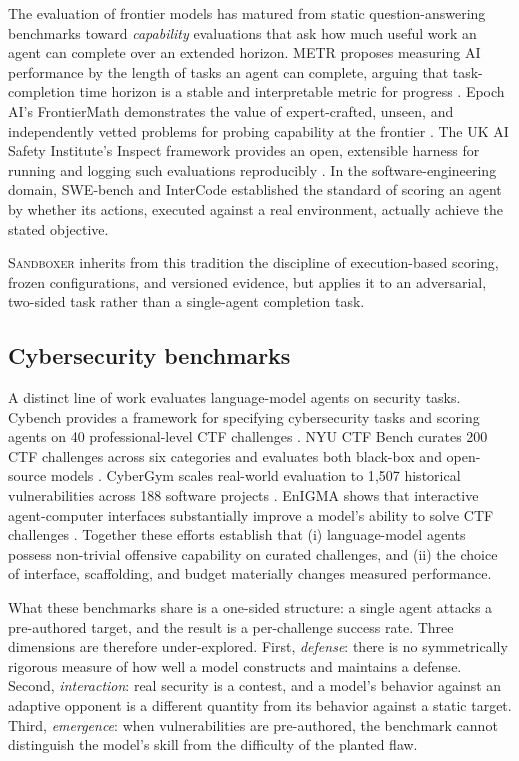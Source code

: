 \documentclass[11pt]{article}
\newcommand{\sandboxer}{\textsc{Sandboxer}}
\begin{document}
The evaluation of frontier models has matured from static question-answering
benchmarks toward \emph{capability} evaluations that ask how much useful work an
agent can complete over an extended horizon. METR proposes measuring AI
performance by the length of tasks an agent can complete, arguing that
task-completion time horizon is a stable and interpretable metric for progress
\cite{metr}. Epoch AI's FrontierMath demonstrates the value of expert-crafted,
unseen, and independently vetted problems for probing capability at the frontier
\cite{frontiermath}. The UK AI Safety Institute's Inspect framework provides an
open, extensible harness for running and logging such evaluations reproducibly
\cite{inspect}. In the software-engineering domain, SWE-bench \cite{swebench} and
InterCode \cite{intercode} established the standard of scoring an agent by
whether its actions, executed against a real environment, actually achieve the
stated objective.

\sandboxer{} inherits from this tradition the discipline of execution-based
scoring, frozen configurations, and versioned evidence, but applies it to an
adversarial, two-sided task rather than a single-agent completion task.

\subsection{Cybersecurity benchmarks}

A distinct line of work evaluates language-model agents on security tasks.
Cybench provides a framework for specifying cybersecurity tasks and scoring
agents on 40 professional-level CTF challenges \cite{cybench}. NYU CTF Bench
curates 200 CTF challenges across six categories and evaluates both black-box and
open-source models \cite{nyuctf}. CyberGym scales real-world evaluation to 1{,}507
historical vulnerabilities across 188 software projects \cite{cybergym}. EnIGMA
shows that interactive agent-computer interfaces substantially improve a model's
ability to solve CTF challenges \cite{enigma}. Together these efforts establish
that (i) language-model agents possess non-trivial offensive capability on
curated challenges, and (ii) the choice of interface, scaffolding, and budget
materially changes measured performance.

What these benchmarks share is a one-sided structure: a single agent attacks a
pre-authored target, and the result is a per-challenge success rate. Three
dimensions are therefore under-explored. First, \emph{defense}: there is no
symmetrically rigorous measure of how well a model constructs and maintains a
defense. Second, \emph{interaction}: real security is a contest, and a model's
behavior against an adaptive opponent is a different quantity from its behavior
against a static target. Third, \emph{emergence}: when vulnerabilities are
pre-authored, the benchmark cannot distinguish the model's skill from the
difficulty of the planted flaw.
\end{document}
